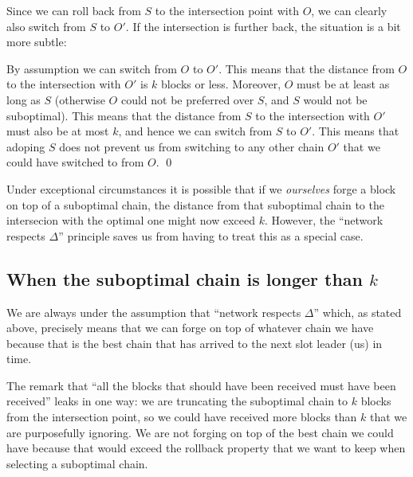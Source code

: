Since we can roll back from $S$ to the intersection point with $O$, we can
clearly also switch from $S$ to $O'$. If the intersection is further back,
the situation is a bit more subtle:

\begin{center}
\end{center}

By assumption we can switch from $O$ to $O'$. This means that the distance from
$O$ to the intersection with $O'$ is $k$ blocks or less. Moreover, $O$ must be
at least as long as $S$ (otherwise $O$ could not be preferred over $S$, and $S$
would not be suboptimal). This means that the distance from $S$ to the
intersection with $O'$ must also be at most $k$, and hence we can switch from
$S$ to $O'$. This means that adoping $S$ does not prevent us from switching to
any other chain $O'$ that we could have switched to from $O$. \qed

Under exceptional circumstances it is possible that if we \emph{ourselves} forge
a block on top of a suboptimal chain, the distance from that suboptimal chain to
the intersecion with the optimal one might now exceed $k$. However, the
``network respects $\Delta$'' principle saves us from having to treat this as a
special case.

\subsection{When the suboptimal chain is longer than $k$}

We are always under the assumption that ``network respects $\Delta$'' which, as
stated above, precisely means that we can forge on top of whatever chain we have
because that is the best chain that has arrived to the next slot leader (us) in
time.

The remark that ``all the blocks that should have been received must have been
received'' leaks in one way: we are truncating the suboptimal chain to $k$
blocks from the intersection point, so we could have received more blocks than
$k$ that we are purposefully ignoring. We are not forging on top of the best
chain we could have because that would exceed the rollback property that we want
to keep when selecting a suboptimal chain.

